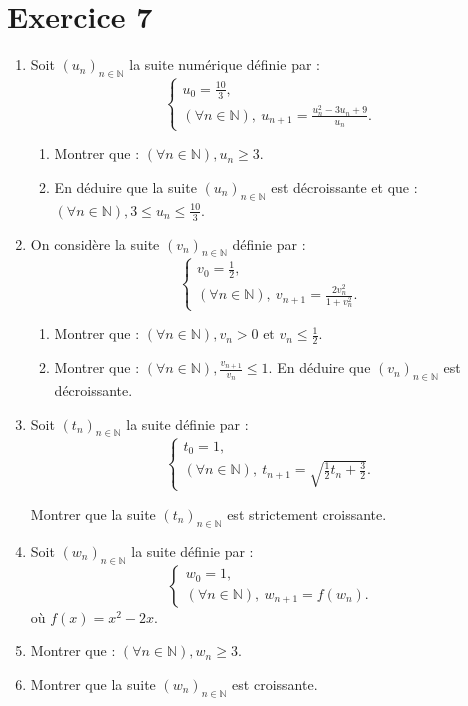 \documentclass[a4paper,11pt]{article}
\begin{document}
\section*{Exercice 7}

\begin{enumerate}

\item Soit \((u_n)_{n \in \mathbb{N}}\) la suite numérique définie par :
\[
\begin{cases}
u_0 = \frac{10}{3}, \\
(\forall n \in \mathbb{N}), \ u_{n+1} = \frac{u_n^2 - 3u_n + 9}{u_n}.
\end{cases}
\]

\begin{enumerate}
    \item Montrer que : \((\forall n \in \mathbb{N}), u_n \geq 3\).
    \item En déduire que la suite \((u_n)_{n \in \mathbb{N}}\) est décroissante et que : \((\forall n \in \mathbb{N}), 3 \leq u_n \leq \frac{10}{3}\).
\end{enumerate}

\item On considère la suite \((v_n)_{n \in \mathbb{N}}\) définie par :
\[
\begin{cases}
v_0 = \frac{1}{2}, \\
(\forall n \in \mathbb{N}), \ v_{n+1} = \frac{2v_n^2}{1 + v_n^2}.
\end{cases}
\]

\begin{enumerate}
    \item Montrer que : \((\forall n \in \mathbb{N}), v_n > 0 \text{ et } v_n \leq \frac{1}{2}\).
    \item Montrer que : \((\forall n \in \mathbb{N}), \frac{v_{n+1}}{v_n}  \leq 1\). En déduire que \((v_n)_{n \in \mathbb{N}}\) est décroissante.
\end{enumerate}

\item Soit \((t_n)_{n \in \mathbb{N}}\) la suite définie par :
\[
\begin{cases}
t_0 = 1, \\
(\forall n \in \mathbb{N}), \ t_{n+1} = \sqrt{\frac{1}{2} t_n + \frac{3}{2}}.
\end{cases}
\]

Montrer que la suite \((t_n)_{n \in \mathbb{N}}\) est strictement croissante.

\item Soit \((w_n)_{n \in \mathbb{N}}\) la suite définie par :
\[
\begin{cases}
w_0 = 1, \\
(\forall n \in \mathbb{N}), \ w_{n+1} = f(w_n).
\end{cases}
\]
où \(f(x) = x^2 - 2x\).

\item Montrer que : \((\forall n \in \mathbb{N}), w_n \geq 3\).
\item Montrer que la suite \((w_n)_{n \in \mathbb{N}}\) est croissante.
\end{enumerate}
\end{document}
